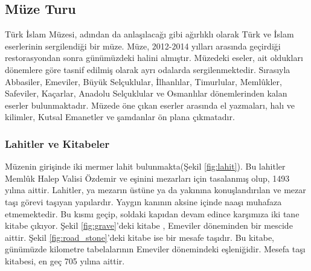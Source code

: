 \subsection{Müze Turu}
\indent\indent Türk İslam Müzesi, adından da anlaşılacağı gibi ağırlıklı olarak Türk ve İslam eserlerinin sergilendiği bir müze. Müze, 2012-2014 yılları arasında geçirdiği restorasyondan sonra günümüzdeki halini almıştır. Müzedeki eseler, ait oldukları dönemlere göre tasnif edilmiş olarak ayrı odalarda sergilenmektedir. Sırasıyla Abbasiler, Emeviler, Büyük Selçuklular, İlhanlılar, Timurlular, Memlûkler, Safeviler, Kaçarlar, Anadolu Selçuklular ve Osmanlılar dönemlerinden kalan eserler bulunmaktadır. Müzede öne çıkan eserler arasında el yazmaları, halı ve kilimler, Kutsal Emanetler ve şamdanlar ön plana çıkmatadır.
\subsubsection{Lahitler ve Kitabeler}
\indent\indent Müzenin girişinde iki mermer lahit bulunmakta(Şekil \ref{fig:lahit}). Bu lahitler Memlûk Halep Valisi Özdemir ve eşinini mezarları için tasalanmış olup, 1493 yılına aittir. Lahitler, ya mezarın üstüne ya da yakınına konuşlandırılan ve mezar taşı görevi taşıyan yapılardır. Yaygın kanının aksine içinde naaşı muhafaza etmemektedir.\newline
\indent Bu kısmı geçip, soldaki kapıdan devam edince karşımıza iki tane kitabe çıkıyor. Şekil \ref{fig:grave}'deki kitabe , Emeviler döneminden bir mescide aittir. Şekil \ref{fig:road_stone}'deki kitabe  ise bir mesafe taşıdır. Bu kitabe, günümüzde kilometre tabelalarının Emeviler dönemindeki eşleniğidir. Mesefa taşı kitabesi, en geç 705 yılına aittir.\newline
